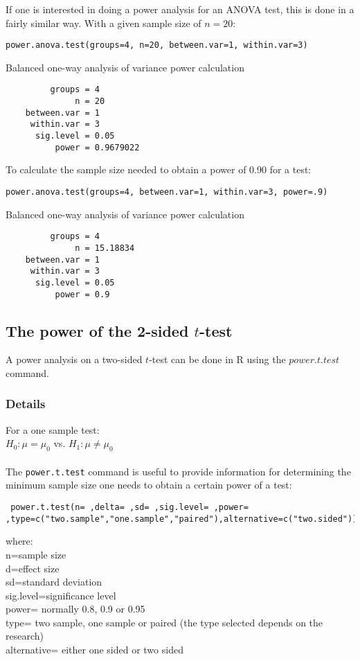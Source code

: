 \documentclass[12pt,a4paper]{article}
\theoremstyle{regla}
\theoremstyle{remark}
\theoremstyle{definition}
\theoremstyle{nonumberbreak}
\begin{document}
\begin{xmpl}
If one is interested in doing a power analysis for an ANOVA test, this is done in a fairly similar way.
With a given sample size of $n=20$:
\begin{lstlisting}
power.anova.test(groups=4, n=20, between.var=1, within.var=3)
\end{lstlisting}
  Balanced one-way analysis of variance power calculation 
\begin{lstlisting}
         groups = 4
              n = 20
    between.var = 1
     within.var = 3
      sig.level = 0.05
          power = 0.9679022

\end{lstlisting}

To calculate the sample size needed to obtain a power of 0.90 for a test:

\begin{lstlisting}
power.anova.test(groups=4, between.var=1, within.var=3, power=.9) 
\end{lstlisting}
Balanced one-way analysis of variance power calculation 
\begin{lstlisting}
         groups = 4
              n = 15.18834
    between.var = 1
     within.var = 3
      sig.level = 0.05
          power = 0.9
\end{lstlisting}
\end{xmpl}

\subsection{The power of the 2-sided $t$-test}
\begin{fbox}
\begin{minipage}{0.97\textwidth}
A power analysis on a two-sided $t$-test can be done in R using the $power.t.test$ command.
\end{minipage}
\end{fbox}
\subsubsection{Details}
For a one sample test:\\
$H_0: \mu=\mu_0$ vs. $H_1:\mu\neq\mu_0$\\
\\
The \texttt{power.t.test} command is useful to provide information for determining the minimum sample size one needs to obtain a certain power of a test:
\begin{lstlisting}
 power.t.test(n= ,delta= ,sd= ,sig.level= ,power= ,type=c("two.sample","one.sample","paired"),alternative=c("two.sided"))
\end{lstlisting}
where:\\
n=sample size\\
d=effect size\\
sd=standard deviation\\
sig.level=significance level\\
power= normally 0.8, 0.9 or 0.95 \\
type= two sample, one sample or paired (the type selected depends on the research)\\
alternative= either one sided or two sided
\end{document}
